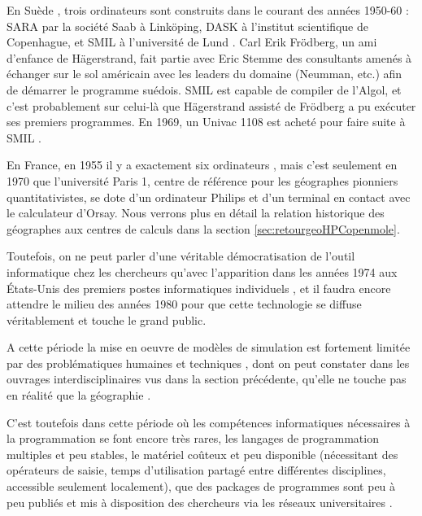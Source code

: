 En Suède , trois ordinateurs sont construits dans le courant des années 1950-60 : SARA par la société Saab à Linköping, DASK à l'institut scientifique de Copenhague, et SMIL à l'université de Lund \autocite{Persson2007}. Carl Erik Frödberg, un ami d'enfance de Hägerstrand, fait partie avec Eric Stemme des consultants amenés à échanger sur le sol américain avec les leaders du domaine (Neumman, etc.) afin de démarrer le programme suédois.  SMIL est capable de compiler de l'Algol, et c'est probablement sur celui-là que Hägerstrand assisté de Frödberg a pu exécuter ses premiers programmes. En 1969, un Univac 1108 est acheté pour faire suite à SMIL \autocite[33-34]{Lindgren2008}.

En France, en 1955 il y a exactement six ordinateurs \autocite[3]{Armatte2008}, mais c'est seulement en 1970 que l'université Paris 1, centre de référence pour les géographes pionniers quantitativistes, se dote d'un ordinateur Philips et d'un terminal en contact avec le calculateur d'Orsay. Nous verrons plus en détail la relation historique des géographes aux centres de calculs dans la section \ref{sec:retourgeoHPCopenmole}.

Toutefois, on ne peut parler d'une véritable démocratisation de l'outil informatique chez les chercheurs qu'avec l'apparition dans les années 1974 aux États-Unis des premiers postes informatiques individuels \autocite[221]{Ceruzzi2000}, et il faudra encore attendre le milieu des années 1980 pour que cette technologie se diffuse véritablement et touche le grand public.

A cette période la mise en oeuvre de modèles de simulation est fortement limitée par des problématiques humaines et techniques \autocites{Haggett1969}[387]{Marble1972}, dont on peut constater dans les ouvrages interdisciplinaires vus dans la section précédente, qu'elle ne touche pas en réalité que la géographie \autocite{Guetzkow1972}.

C'est toutefois dans cette période où les compétences informatiques nécessaires à la programmation se font encore très rares, les langages de programmation multiples et peu stables, le matériel coûteux et peu disponible (nécessitant des opérateurs de saisie, temps d'utilisation partagé entre différentes disciplines, accessible seulement localement), que des packages de programmes sont peu à peu publiés et mis à disposition des chercheurs via les réseaux universitaires \autocite{Haggett1969}. 


